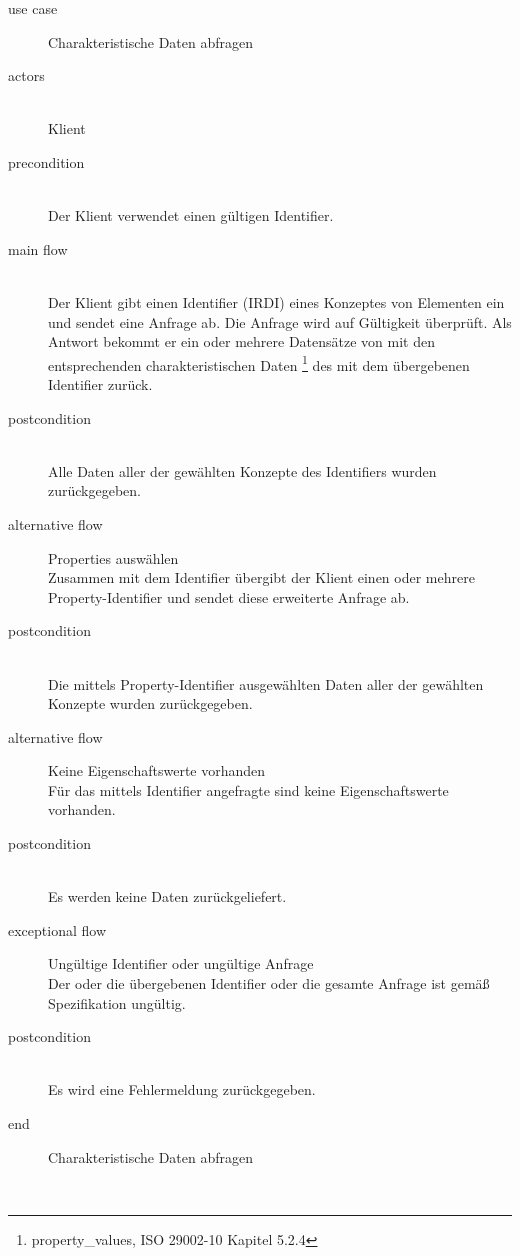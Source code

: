 {\small

\begin{description}
     \item[use case] Charakteristische Daten abfragen
     \item[  actors]~\\
     Klient
     \item[  precondition]~\\
     Der Klient verwendet einen gültigen Identifier.
     \item[  main flow]~\\
     Der Klient gibt einen Identifier (\gls{IRDI}) eines Konzeptes von Elementen ein und sendet eine Anfrage ab. Die Anfrage wird auf Gültigkeit überprüft. Als Antwort bekommt er ein oder mehrere Datensätze von  mit den entsprechenden charakteristischen Daten \footnote{property\_values, ISO 29002-10 Kapitel 5.2.4} des  mit dem übergebenen Identifier zurück.
     \item[  postcondition]~\\
     Alle Daten aller  der gewählten Konzepte des Identifiers wurden zurückgegeben.    
     \item[  alternative flow] Properties auswählen ~\\
     Zusammen mit dem Identifier übergibt der Klient einen oder mehrere Property-Identifier und sendet diese erweiterte Anfrage ab.    
     \item[  postcondition]~\\
     Die mittels Property-Identifier ausgewählten Daten aller   der gewählten Konzepte wurden zurückgegeben.    
     \item[  alternative flow] Keine Eigenschaftswerte vorhanden ~\\
     Für das mittels Identifier angefragte  sind keine Eigenschaftswerte vorhanden.    
     \item[  postcondition]~\\
     Es werden keine Daten zurückgeliefert.   
     \item[  exceptional flow] Ungültige Identifier oder ungültige Anfrage ~\\
     Der oder die übergebenen Identifier oder die gesamte Anfrage ist gemäß Spezifikation ungültig.  
     \item[  postcondition]~\\
     Es wird eine Fehlermeldung zurückgegeben.  
     \item[end] Charakteristische Daten abfragen
\end{description}

~\\

} %

